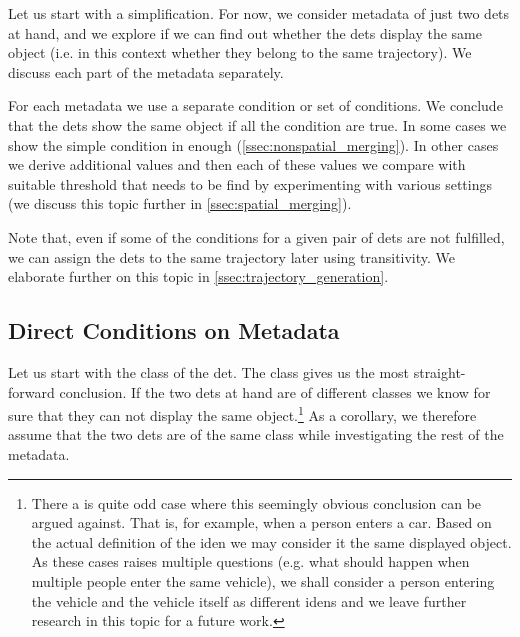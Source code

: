 Let us start with a simplification. For now, we consider metadata of just two \glspl{det} at hand, and we explore if we can find out whether the \glspl{det} display the same object (i.e. in this context whether they belong to the same trajectory). We discuss each part of the metadata separately.

For each metadata we use a separate condition or set of conditions. We conclude that the \glspl{det} show the same object if all the condition are true. In some cases we show the simple condition in enough (\autoref{ssec:nonspatial_merging}). In other cases we derive additional values and then each of these values we compare with suitable threshold that needs to be find by experimenting with various settings (we discuss this topic further in \autoref{ssec:spatial_merging}).

Note that, even if some of the conditions for a given pair of \glspl{det} are not fulfilled, we can assign the \glspl{det} to the same trajectory later using transitivity. We elaborate further on this topic in \autoref{ssec:trajectory_generation}.

\subsection{Direct Conditions on Metadata}

\label{ssec:nonspatial_merging}

Let us start with the class of the \gls{det}. The class
gives us the most straight-forward conclusion.
If the two \glspl{det} at hand are of different classes we know for sure
that they can not display the same
object.\footnote{There a is quite
odd case where this seemingly obvious conclusion can be argued against. That
is, for example, when a person enters a car. Based on the actual definition of
the \gls{iden} we may consider it the same displayed object. As these cases
raises multiple questions (e.g. what should happen when multiple people enter the same vehicle), we shall consider a person entering the vehicle and the vehicle itself as different
\glspl{iden} and we leave further research in this topic for a
future work.} As a corollary, we therefore assume that the two \glspl{det} are
of the same class while investigating the rest of the metadata.

